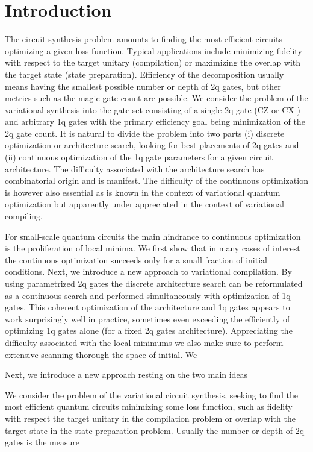 \documentclass[draft, amsfonts, amssymb, aps, nofootinbib, twocolumn]{revtex4-2}
\newcommand{\CZ}{CZ }
\newcommand{\CX}{CX }
\begin{document}
\section{Introduction}
The circuit synthesis problem amounts to finding the most efficient circuits optimizing a given loss function. Typical applications include minimizing fidelity with respect to the target unitary (compilation) or maximizing the overlap with the target state (state preparation). Efficiency of the decomposition usually means having the smallest possible number or depth of 2q gates, but other metrics such as the magic gate count are possible. We consider the problem of the variational synthesis into the gate set consisting of a single 2q gate (\CZ or \CX) and arbitrary 1q gates with the primary efficiency goal being minimization of the 2q gate count. It is natural to divide the problem into two parts (i) discrete optimization or architecture search, looking for best placements of 2q gates and (ii) continuous optimization of the 1q gate parameters for a given circuit architecture. The difficulty associated with the architecture search has combinatorial origin and is manifest. The difficulty of the continuous optimization is however also essential as is known in the context of variational quantum optimization but apparently under appreciated in the context of variational compiling.

For small-scale quantum circuits the main hindrance to continuous optimization is the proliferation of local minima. We first show that in many cases of interest the continuous optimization succeeds only for a small fraction of initial conditions. Next, we introduce a new approach to variational compilation. By using parametrized 2q gates the discrete architecture search can be reformulated as a continuous search and performed simultaneously with optimization of 1q gates. This coherent optimization of the architecture and 1q gates appears to work surprisingly well in practice, sometimes even exceeding the efficiently of optimizing 1q gates alone (for a fixed 2q gates architecture). Appreciating the difficulty associated with the local minimums we also make sure to perform extensive scanning thorough the space of initial. We 


Next, we introduce a new approach resting on the two main ideas

We consider the problem of the variational circuit synthesis, seeking to find the most efficient quantum circuits minimizing some loss function, such as fidelity with respect the target unitary in the compilation problem or overlap with the target state in the state preparation problem. Usually the number or depth of 2q gates is the measure 
\end{document}
